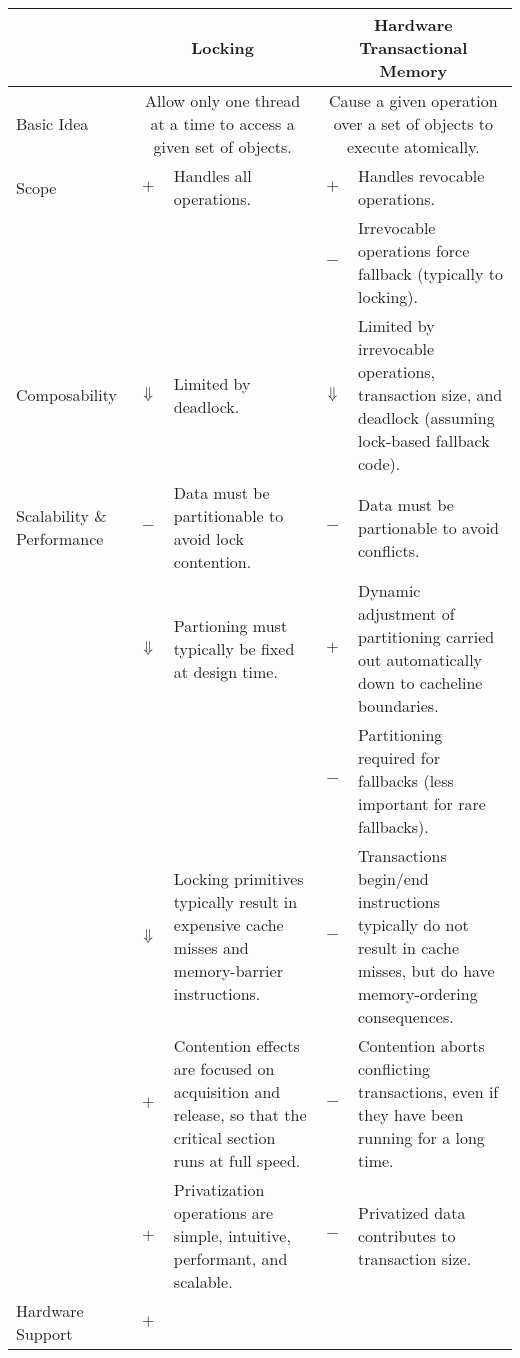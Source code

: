 
\begin{table*}[p]
\centering
\small
\begin{tabular}{p{1.0in}||c|p{2.0in}||c|p{2.0in}}
& \multicolumn{2}{c||}{Locking} & \multicolumn{2}{c}{Hardware Transactional Memory} \\
\hline
\hline
Basic Idea
	& \multicolumn{2}{p{2.2in}||}{
	  Allow only one thread at a time to access a given set of objects.}
		& \multicolumn{2}{p{2.2in}}{
		  Cause a given operation over a set of objects to execute
		  atomically.} \\
\hline
\hline
Scope
	& $+$
	& Handles all operations.
		& $+$
		& Handles revocable operations. \\
\cline{4-5}
	& &
		& $-$
		& Irrevocable operations force fallback (typically
		  to locking). \\
\hline
Composability
	& $\Downarrow$
	& Limited by deadlock.
		& $\Downarrow$
		& Limited by irrevocable operations, transaction size,
		  and deadlock (assuming lock-based fallback code). \\
\hline
Scalability \& Performance
	& $-$
	& Data must be partitionable to avoid lock contention.
		& $-$
		& Data must be partionable to avoid conflicts. \\
\cline{2-5}
	& $\Downarrow$
	& Partioning must typically be fixed at design time.
		& $+$
		& Dynamic adjustment of partitioning carried out
		  automatically down to cacheline boundaries. \\
\cline{4-5}
	&
	&
		& $-$
		& Partitioning required for fallbacks (less important
		  for rare fallbacks). \\
\cline{2-5}
	& $\Downarrow$
	& Locking primitives typically result in expensive cache misses
	  and memory-barrier instructions.
		& $-$
		& Transactions begin/end instructions typically do not
		  result in cache misses, but do have memory-ordering
		  consequences. \\
\cline{2-5}
	& $+$
	& Contention effects are focused on acquisition and release, so
	  that the critical section runs at full speed.
		& $-$
		& Contention aborts conflicting transactions, even
		  if they have been running for a long time. \\
\cline{2-5}
	& $+$
	& Privatization operations are simple, intuitive, performant,
	  and scalable.
		& $-$
		& Privatized data contributes to transaction size. \\
\hline
Hardware Support
	& $+$

\end{tabular}
\end{table*}
